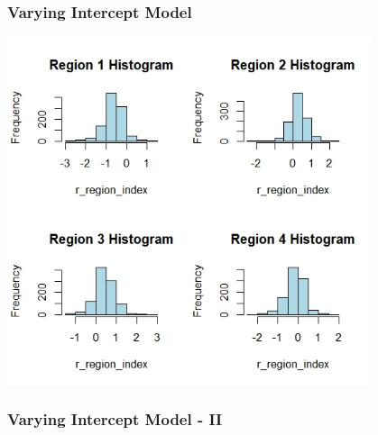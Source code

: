 \documentclass{beamer}
\begin{document}
\begin{frame}
\frametitle{Varying Intercept Model}

\begin{center}
    \includegraphics[width=0.8\textwidth]{placeholder_hist_varying_intercept_1_level.jpeg}
\end{center}

\end{frame}


\begin{frame}
  \frametitle{Varying Intercept Model - II}%
  
\end{frame}
\end{document}
